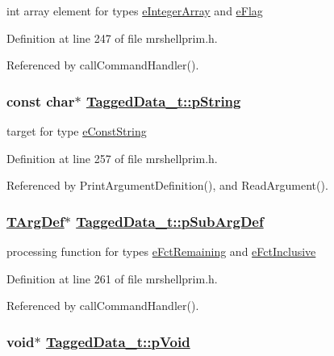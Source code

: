 int array element for types \hyperlink{mrshellprim_8h_76a810650461f2062938ee9b82666b36f56ebbf9f6232a573f846cffa9f914e9}{e\-Integer\-Array} and \hyperlink{mrshellprim_8h_76a810650461f2062938ee9b82666b36514baa0f6ca7bbfba804b8826c13cffb}{e\-Flag} 



Definition at line 247 of file mrshellprim.h.

Referenced by call\-Command\-Handler().\hypertarget{structTaggedData__t_3ec8155fed9da63b73d80c0ef41ab2a4}{
\subsubsection[pString]{\setlength{\rightskip}{0pt plus 5cm}const char$\ast$ \hyperlink{structTaggedData__t_3ec8155fed9da63b73d80c0ef41ab2a4}{Tagged\-Data\_\-t::p\-String}}}
\label{structTaggedData__t_3ec8155fed9da63b73d80c0ef41ab2a4}


target for type \hyperlink{mrshellprim_8h_76a810650461f2062938ee9b82666b369bf242e7bb183d9518928958c83c9a22}{e\-Const\-String} 



Definition at line 257 of file mrshellprim.h.

Referenced by Print\-Argument\-Definition(), and Read\-Argument().\hypertarget{structTaggedData__t_efbba58fc516f932be799255c9b5e119}{
\subsubsection[pSubArgDef]{\setlength{\rightskip}{0pt plus 5cm}\hyperlink{structArgDef__t}{TArg\-Def}$\ast$ \hyperlink{structTaggedData__t_efbba58fc516f932be799255c9b5e119}{Tagged\-Data\_\-t::p\-Sub\-Arg\-Def}}}
\label{structTaggedData__t_efbba58fc516f932be799255c9b5e119}


processing function for types \hyperlink{mrshellprim_8h_76a810650461f2062938ee9b82666b36b36d09249e94b5aa513d0aa3c7aa08c8}{e\-Fct\-Remaining} and \hyperlink{mrshellprim_8h_76a810650461f2062938ee9b82666b364c15eefaf9247f7b503ae586294be587}{e\-Fct\-Inclusive} 



Definition at line 261 of file mrshellprim.h.

Referenced by call\-Command\-Handler().\hypertarget{structTaggedData__t_5aa3ac9b92e687fc48272ced2ec2f662}{
\subsubsection[pVoid]{\setlength{\rightskip}{0pt plus 5cm}void$\ast$ \hyperlink{structTaggedData__t_5aa3ac9b92e687fc48272ced2ec2f662}{Tagged\-Data\_\-t::p\-Void}}}
\label{structTaggedData__t_5aa3ac9b92e687fc48272ced2ec2f662}


